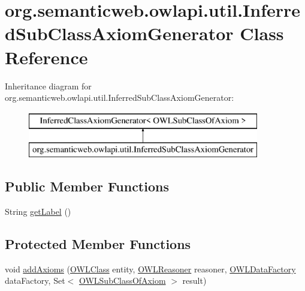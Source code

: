 \hypertarget{classorg_1_1semanticweb_1_1owlapi_1_1util_1_1_inferred_sub_class_axiom_generator}{\section{org.\-semanticweb.\-owlapi.\-util.\-Inferred\-Sub\-Class\-Axiom\-Generator Class Reference}
\label{classorg_1_1semanticweb_1_1owlapi_1_1util_1_1_inferred_sub_class_axiom_generator}
}
Inheritance diagram for org.\-semanticweb.\-owlapi.\-util.\-Inferred\-Sub\-Class\-Axiom\-Generator\-:\begin{figure}[H]
\begin{center}
\leavevmode
\includegraphics[height=2.000000cm]{classorg_1_1semanticweb_1_1owlapi_1_1util_1_1_inferred_sub_class_axiom_generator}
\end{center}
\end{figure}
\subsection*{Public Member Functions}
\begin{DoxyCompactItemize}
\item 
String \hyperlink{classorg_1_1semanticweb_1_1owlapi_1_1util_1_1_inferred_sub_class_axiom_generator_a2f6eda0ead90054caff7bc08e81c82da}{get\-Label} ()
\end{DoxyCompactItemize}
\subsection*{Protected Member Functions}
\begin{DoxyCompactItemize}
\item 
void \hyperlink{classorg_1_1semanticweb_1_1owlapi_1_1util_1_1_inferred_sub_class_axiom_generator_a058cc5e7fecd0c98a60804625e22ea36}{add\-Axioms} (\hyperlink{interfaceorg_1_1semanticweb_1_1owlapi_1_1model_1_1_o_w_l_class}{O\-W\-L\-Class} entity, \hyperlink{interfaceorg_1_1semanticweb_1_1owlapi_1_1reasoner_1_1_o_w_l_reasoner}{O\-W\-L\-Reasoner} reasoner, \hyperlink{interfaceorg_1_1semanticweb_1_1owlapi_1_1model_1_1_o_w_l_data_factory}{O\-W\-L\-Data\-Factory} data\-Factory, Set$<$ \hyperlink{interfaceorg_1_1semanticweb_1_1owlapi_1_1model_1_1_o_w_l_sub_class_of_axiom}{O\-W\-L\-Sub\-Class\-Of\-Axiom} $>$ result)
\end{DoxyCompactItemize}



